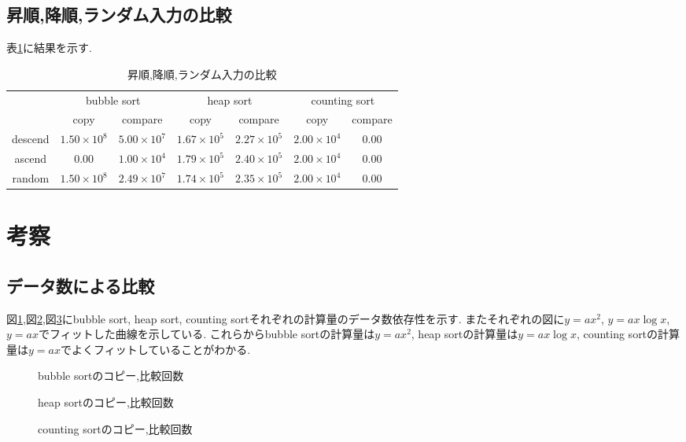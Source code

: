 \documentclass[uplatex,a4j,11pt,dvipdfmx]{jsarticle}
\begin{document}
\subsection{昇順,降順,ランダム入力の比較}
表\ref{tab:1}に結果を示す.
\begin{table}[h]
\caption{昇順,降順,ランダム入力の比較}
\label{tab:1}
\centering
\begin{tabular}{c|cc|cc|cc}
\hline
&\multicolumn{2}{c|}{bubble sort}&\multicolumn{2}{c|}{heap sort}&\multicolumn{2}{c}{counting sort}\\
&copy&compare&copy&compare&copy&compare\\
\hline \hline
descend & $1.50\times10^{8}$ & $5.00\times10^{7}$ & $1.67\times10^{5}$ & $2.27\times10^{5}$ & $2.00\times10^{4}$ & $0.00$\\
ascend  & $0.00$             & $1.00\times10^{4}$ & $1.79\times10^{5}$ & $2.40\times10^{5}$ & $2.00\times10^{4}$ & $0.00$\\
random  & $1.50\times10^{8}$ & $2.49\times10^{7}$ & $1.74\times10^{5}$ & $2.35\times10^{5}$ & $2.00\times10^{4}$ & $0.00$\\
\hline
\end{tabular}
\end{table}
\clearpage
\section{考察}
\subsection{データ数による比較}
図\ref{fig:col_b},図\ref{fig:col_h},図\ref{fig:col_c}にbubble sort, heap sort, counting sortそれぞれの計算量のデータ数依存性を示す.
またそれぞれの図に$y=ax^2$, $y=ax\log x$, $y=ax$でフィットした曲線を示している.
これらからbubble sortの計算量は$y=ax^2$, heap sortの計算量は$y=ax\log x$, counting sortの計算量は$y=ax$でよくフィットしていることがわかる.
\begin{figure}[hptb]
  \begin{center}
    
    \caption{bubble sortのコピー,比較回数}
    \label{fig:col_b}
  \end{center}
\end{figure}
\begin{figure}[hptb]
  \begin{center}
    
    \caption{heap sortのコピー,比較回数}
    \label{fig:col_h}
  \end{center}
\end{figure}
\begin{figure}[hptb]
  \begin{center}
    
    \caption{counting sortのコピー,比較回数}
    \label{fig:col_c}
  \end{center}
\end{figure}
\clearpage
\end{document}
